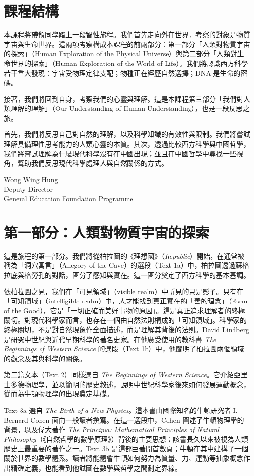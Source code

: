 \section*{課程結構}
\noindent 本課程將帶領同學踏上一段智性旅程。我們首先走向外在世界，考察的對象是物質宇宙與生命世界。這兩項考察構成本課程的前兩部分：第一部分「人類對物質宇宙的探索」（Human Exploration of the Physical Universe）與第二部分「人類對生命世界的探索」（Human Exploration of the World of Life）。我們將認識西方科學若干重大發現：宇宙受物理定律支配；物種正在經歷自然選擇；DNA 是生命的密碼。

\noindent 接著，我們將回到自身，考察我們的心靈與理解。這是本課程第三部分「我們對人類理解的理解」（Our Understanding of Human Understanding），也是一段反思之旅。

\noindent 首先，我們將反思自己對自然的理解，以及科學知識的有效性與限制。我們將嘗試理解具備理性思考能力的人類心靈的本質。其次，透過比較西方科學與中國哲學，我們將嘗試理解為什麼現代科學沒有在中國出現；並且在中國哲學中尋找一些視角，幫助我們反思現代科學處理人與自然關係的方式。

\vspace{1em}

\noindent Wong Wing Hung\\
Deputy Director\\
General Education Foundation Programme

\section*{第一部分：人類對物質宇宙的探索}
\noindent 這是旅程的第一部分。我們將從柏拉圖的《理想國》（\textit{Republic}）開始。在通常被稱為「洞穴寓言」（Allegory of the Cave）的選段（Text 1a）中，柏拉圖透過蘇格拉底與格勞孔的對話，區分了感知與實在。這一區分奠定了西方科學的基本基調。

\noindent 依柏拉圖之見，我們在「可見領域」（visible realm）中所見的只是影子。只有在「可知領域」（intelligible realm）中，人才能找到真正實在的「善的理念」（Form of the Good），它是「一切正確而美好事物的原因」。這是真正追求理解者的終極關切。對現代科學家而言，也存在一個由自然法則構成的「可知領域」。科學家的終極關切，不是對自然現象作全面描述，而是理解其背後的法則。David Lindberg 是研究中世紀與近代早期科學的著名史家。在他廣受使用的教科書 \textit{The Beginnings of Western Science} 的選段（Text 1b）中，他闡明了柏拉圖兩個領域的觀念及其與科學的關係。

\noindent 第二篇文本（Text 2）同樣選自 \textit{The Beginnings of Western Science}。它介紹亞里士多德物理學，並以簡明的歷史敘述，說明中世紀科學家後來如何發展運動概念，從而為牛頓物理學的出現奠定基礎。

\noindent Text 3a 選自 \textit{The Birth of a New Physics}。這本書由國際知名的牛頓研究者 I. Bernard Cohen 面向一般讀者撰寫。在這一選段中，Cohen 闡述了牛頓物理學的背景，以及偉大著作 \textit{The Principia: Mathematical Principles of Natural Philosophy}（《自然哲學的數學原理》）背後的主要思想；該書長久以來被視為人類歷史上最重要的著作之一。Text 3b 是這部巨著開首數頁；牛頓在其中建構了一個關於世界的數學體系。讀者將能體會牛頓如何努力為質量、力、運動等抽象概念作出精確定義，也能看到他試圖在數學與哲學之間劃定界線。

